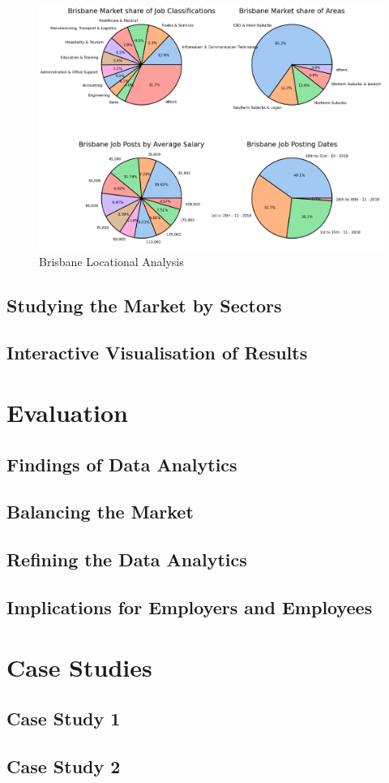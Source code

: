\documentclass[twoside, 12pt, a4paper]{article}
\begin{document}
\newpage
\begin{figure}[h]
	\centering
	\includegraphics[scale = 0.26]{BrisbaneLocational.png}
	\caption{Brisbane Locational Analysis}
	\label{fig:BrisLoc}
\end{figure}

\newpage
\subsection{Studying the Market by Sectors}

\newpage
\subsection{Interactive Visualisation of Results}


\newpage
\section{Evaluation}
\subsection{Findings of Data Analytics}
\subsection{Balancing the Market}
\subsection{Refining the Data Analytics}
\subsection{Implications for Employers and Employees}

\newpage
\section{Case Studies}
\subsection{Case Study 1}
\subsection{Case Study 2}
\end{document}

